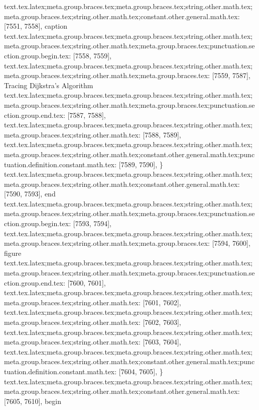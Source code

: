 {{{{{{{{{{{{{{{{{{{{{{{{{{{{{{{{{{{{{{{{{{{{{{{{{{{{{{{{{{{{{{{{{{{{{{{{{{{{{{{{{{{{{{{{{{{{{{{{{{{{{{{{{{{{{{{{{{{{{{{{{{{{{{{{{{{{{{{{{{{{{{{{{{{{{{{{{{{{{{{{{{{{{{{{{{{{{{{{{{{{{{{{{{{{{{{{{{{{{{{{{{{{{{text.tex.latex;meta.group.braces.tex;meta.group.braces.tex;string.other.math.tex;meta.group.braces.tex;string.other.math.tex;constant.other.general.math.tex: [7551, 7558], {caption}
text.tex.latex;meta.group.braces.tex;meta.group.braces.tex;string.other.math.tex;meta.group.braces.tex;string.other.math.tex;meta.group.braces.tex;punctuation.section.group.begin.tex: [7558, 7559], {{}
text.tex.latex;meta.group.braces.tex;meta.group.braces.tex;string.other.math.tex;meta.group.braces.tex;string.other.math.tex;meta.group.braces.tex: [7559, 7587], {Tracing Dijkstra's Algorithm}
text.tex.latex;meta.group.braces.tex;meta.group.braces.tex;string.other.math.tex;meta.group.braces.tex;string.other.math.tex;meta.group.braces.tex;punctuation.section.group.end.tex: [7587, 7588], {}}
text.tex.latex;meta.group.braces.tex;meta.group.braces.tex;string.other.math.tex;meta.group.braces.tex;string.other.math.tex: [7588, 7589], {
}
text.tex.latex;meta.group.braces.tex;meta.group.braces.tex;string.other.math.tex;meta.group.braces.tex;string.other.math.tex;constant.other.general.math.tex;punctuation.definition.constant.math.tex: [7589, 7590], {\}
text.tex.latex;meta.group.braces.tex;meta.group.braces.tex;string.other.math.tex;meta.group.braces.tex;string.other.math.tex;constant.other.general.math.tex: [7590, 7593], {end}
text.tex.latex;meta.group.braces.tex;meta.group.braces.tex;string.other.math.tex;meta.group.braces.tex;string.other.math.tex;meta.group.braces.tex;punctuation.section.group.begin.tex: [7593, 7594], {{}
text.tex.latex;meta.group.braces.tex;meta.group.braces.tex;string.other.math.tex;meta.group.braces.tex;string.other.math.tex;meta.group.braces.tex: [7594, 7600], {figure}
text.tex.latex;meta.group.braces.tex;meta.group.braces.tex;string.other.math.tex;meta.group.braces.tex;string.other.math.tex;meta.group.braces.tex;punctuation.section.group.end.tex: [7600, 7601], {}}
text.tex.latex;meta.group.braces.tex;meta.group.braces.tex;string.other.math.tex;meta.group.braces.tex;string.other.math.tex: [7601, 7602], {
}
text.tex.latex;meta.group.braces.tex;meta.group.braces.tex;string.other.math.tex;meta.group.braces.tex;string.other.math.tex: [7602, 7603], {
}
text.tex.latex;meta.group.braces.tex;meta.group.braces.tex;string.other.math.tex;meta.group.braces.tex;string.other.math.tex: [7603, 7604], {
}
text.tex.latex;meta.group.braces.tex;meta.group.braces.tex;string.other.math.tex;meta.group.braces.tex;string.other.math.tex;constant.other.general.math.tex;punctuation.definition.constant.math.tex: [7604, 7605], {\}
text.tex.latex;meta.group.braces.tex;meta.group.braces.tex;string.other.math.tex;meta.group.braces.tex;string.other.math.tex;constant.other.general.math.tex: [7605, 7610], {begin}
}}}}}}}}}}}}}}}}}}}}}}}}}}}}}}}}}}}}}}}}}}}}}}}}}}}}}}}}}}}}}}}}}}}}}}}}}}}}}}}}}}}}}}}}}}}}}}}}}}}}}}}}}}}}}}}}}}}}}}}}}}}}}}}}}}}}}}}}}}}}}}}}}}}}}}}}}}}}}}}}}}}}}}}}}}}}}}}}}}}}}}}}}}}}}}}}}}}}}}}}}}}}}}}}
